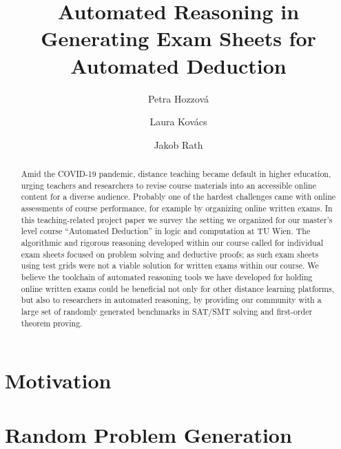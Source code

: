 \documentclass[runningheads]{llncs}
\title{Automated Reasoning in Generating Exam Sheets for Automated Deduction}
\author{Petra Hozzov\'a\and
Laura Kov\'acs \and
Jakob Rath}
\institute{
    TU Wien, Austria
}
\begin{document}
\maketitle





\begin{abstract}
Amid the COVID-19 pandemic, distance teaching became default in higher education,
urging teachers and researchers to revise course materials into an
accessible online content for a diverse audience. Probably one of the hardest challenges
came with online assessments of course performance, for example by
organizing online written exams.
In this teaching-related project paper we survey the 
setting  we organized for our master's level course ``Automated
Deduction'' in logic and computation at TU Wien.
The algorithmic and rigorous reasoning developed within our
course called for individual exam sheets focused on problem solving and deductive
proofs; as such exam sheets using test grids were not a viable solution
for written exams within our course.
We believe the toolchain of automated reasoning tools we have developed for
holding online written exams could be beneficial not only for other
distance learning platforms, but also to researchers in automated
reasoning, by providing our community with a large set of randomly generated benchmarks in SAT/SMT solving and first-order theorem proving.
\end{abstract}





\section{Motivation}





%



\section{Random Problem Generation}\label{sec:satfo}
\end{document}
